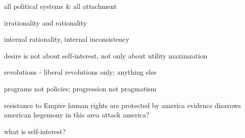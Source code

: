 all political systems & all attachment

irrationality and rationality

internal rationality, internal inconsistency

desire is not about self-interest, not only about utility maximzation

revolutions - liberal revolutions only; anything else

programs not policies; progression not pragmatism

resistance to Empire
human rights are protected by america
evidence disavows american hegemony in this area
attack america?

what is self-interest?